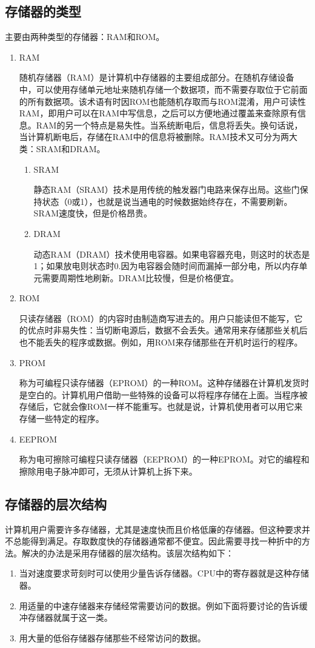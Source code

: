 \subsection{存储器的类型}
主要由两种类型的存储器：RAM和ROM。
\begin{enumerate}
	\item RAM

	随机存储器（RAM）是计算机中存储器的主要组成部分。在随机存储设备中，可以使用存储单元地址来随机存储一个数据项，而不需要存取位于它前面的所有数据项。该术语有时因ROM也能随机存取而与ROM混淆，用户可读性RAM，即用户可以在RAM中写信息，之后可以方便地通过覆盖来查除原有信息。RAM的另一个特点是易失性。当系统断电后，信息将丢失。换句话说，当计算机断电后，存储在RAM中的信息将被删除。RAM技术又可分为两大类：SRAM和DRAM。
	\begin{enumerate}
		\item SRAM

		静态RAM（SRAM）技术是用传统的触发器门电路来保存出局。这些门保持状态（0或1），也就是说当通电的时候数据始终存在，不需要刷新。SRAM速度快，但是价格昂贵。
		\item DRAM

		动态RAM（DRAM）技术使用电容器。如果电容器充电，则这时的状态是1；如果放电则状态时0.因为电容器会随时间而漏掉一部分电，所以内存单元需要周期性地刷新。DRAM比较慢，但是价格便宜。
	\end{enumerate}
	\item ROM

	只读存储器（ROM）的内容时由制造商写进去的。用户只能读但不能写，它的优点时非易失性：当切断电源后，数据不会丢失。通常用来存储那些关机后也不能丢失的程序或数据。例如，用ROM来存储那些在开机时运行的程序。
	\item PROM

	称为可编程只读存储器（EPROM）的一种ROM。这种存储器在计算机发货时是空白的。计算机用户借助一些特殊的设备可以将程序存储在上面。当程序被存储后，它就会像ROM一样不能重写。也就是说，计算机使用者可以用它来存储一些特定的程序。
	\item EEPROM

	称为电可擦除可编程只读存储器（EEPROM）的一种EPROM。对它的编程和擦除用电子脉冲即可，无须从计算机上拆下来。

\end{enumerate}

\subsection{存储器的层次结构}
计算机用户需要许多存储器，尤其是速度快而且价格低廉的存储器。但这种要求并不总能得到满足。存取数度快的存储器通常都不便宜。因此需要寻找一种折中的方法。解决的办法是采用存储器的层次结构。该层次结构如下：
\begin{enumerate}
	\item 当对速度要求苛刻时可以使用少量告诉存储器。CPU中的寄存器就是这种存储器。
	\item 用适量的中速存储器来存储经常需要访问的数据。例如下面将要讨论的告诉缓冲存储器就属于这一类。
	\item 用大量的低俗存储器存储那些不经常访问的数据。
\end{enumerate}
